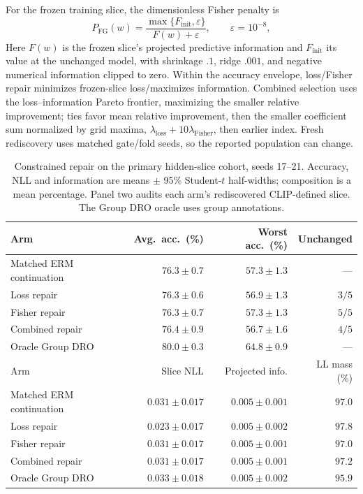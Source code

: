 For the frozen training slice, the dimensionless Fisher penalty is
\begin{equation}
P_{\mathrm{FG}}(w)=\frac{\max\{F_{\mathrm{init}},\varepsilon\}}{F(w)+\varepsilon},
\qquad \varepsilon=10^{-8},
\label{eq:e-dimensionless-penalty}
\end{equation}
Here $F(w)$ is the frozen slice's projected predictive information and $F_{\mathrm{init}}$ its value at the unchanged model, with shrinkage $.1$, ridge $.001$, and negative numerical information clipped to zero. Within the accuracy envelope, loss/Fisher repair minimizes frozen-slice loss/maximizes information. Combined selection uses the loss--information Pareto frontier, maximizing the smaller relative improvement; ties favor mean relative improvement, then the smaller coefficient sum normalized by grid maxima, $\lambda_{\mathrm{loss}}+10\lambda_{\mathrm{Fisher}}$, then earlier index. Fresh rediscovery uses matched gate/fold seeds, so the reported population can change.

\begin{table}[H]
\centering\small
\caption{Constrained repair on the primary hidden-slice cohort, seeds 17--21. Accuracy, NLL and information are means $\pm$ 95\% Student-$t$ half-widths; composition is a mean percentage. Panel two audits each arm's rediscovered CLIP-defined slice. The Group DRO oracle uses group annotations.}
\label{tab:e-repair-performance}\label{tab:e-repair-slices}
\begin{tabular}{@{}lrrr@{}}
\toprule
Arm & Avg.\ acc.\ (\%) & Worst acc.\ (\%) & Unchanged\\
\midrule
Matched ERM continuation & $76.3\pm0.7$ & $57.3\pm1.3$ & ---\\
Loss repair & $76.3\pm0.6$ & $56.9\pm1.3$ & $3/5$\\
Fisher repair & $76.3\pm0.7$ & $57.3\pm1.3$ & $5/5$\\
Combined repair & $76.4\pm0.9$ & $56.7\pm1.6$ & $4/5$\\
Oracle Group DRO & $80.0\pm0.3$ & $64.8\pm0.9$ & ---\\
\midrule
Arm & Slice NLL & Projected info. & LL mass (\%)\\
\midrule
Matched ERM continuation & $0.031\pm0.017$ & $0.005\pm0.001$ & $97.0$\\
Loss repair & $0.023\pm0.017$ & $0.005\pm0.002$ & $97.8$\\
Fisher repair & $0.031\pm0.017$ & $0.005\pm0.001$ & $97.0$\\
Combined repair & $0.031\pm0.017$ & $0.005\pm0.001$ & $97.2$\\
Oracle Group DRO & $0.033\pm0.018$ & $0.005\pm0.002$ & $95.9$\\
\bottomrule
\end{tabular}
\end{table}

